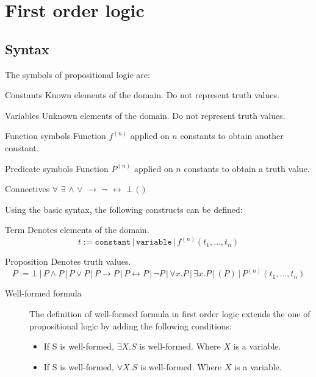 \chapter{First order logic}


\section{Syntax}
The symbols of propositional logic are:
\begin{descriptionlist}
    \item[Constants]
        Known elements of the domain. Do not represent truth values.
        
    \item[Variables]
        Unknown elements of the domain. Do not represent truth values.
    
    \item[Function symbols] 
        Function $f^{(n)}$ applied on $n$ constants to obtain another constant.

    \item[Predicate symbols]
        Function $P^{(n)}$ applied on $n$ constants to obtain a truth value.

    \item[Connectives] $\forall$ $\exists$ $\land$ $\vee$ $\rightarrow$ $\lnot$ $\leftrightarrow$ $\bot$ $($ $)$
\end{descriptionlist}

Using the basic syntax, the following constructs can be defined:
\begin{descriptionlist}
    \item[Term] Denotes elements of the domain.
        \[ t := \texttt{constant} \,|\, \texttt{variable} \,|\, f^{(n)}(t_1, \dots, t_n) \]

    \item[Proposition] Denotes truth values.
        \[
            P := \bot \,|\, P \land P \,|\, P \vee P \,|\,  P \rightarrow P \,|\, P \leftrightarrow P \,|\, 
                \lnot P \,|\, \forall x. P \,|\, \exists x. P \,|\, (P) \,|\, P^{(n)}(t_1, \dots, t_n) 
        \]
\end{descriptionlist}


\begin{description}
    \item[Well-formed formula] 
        The definition of well-formed formula in first order logic extends the one of
        propositional logic by adding the following conditions:
        \begin{itemize}
            \item If S is well-formed, $\exists X. S$ is well-formed. Where $X$ is a variable.
            \item If S is well-formed, $\forall X. S$ is well-formed. Where $X$ is a variable.
        \end{itemize}
\end{description}
